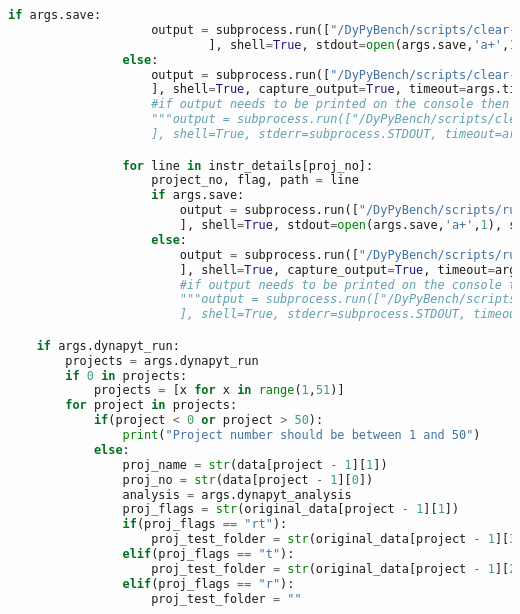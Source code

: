 \begin{lstlisting}[caption=Access Interface of DyPyBench.,label=code:dypybench.py,language=Python]
                if args.save:
                    output = subprocess.run(["/DyPyBench/scripts/clear-project.sh %s %s" %(proj_name, proj_no)
                            ], shell=True, stdout=open(args.save,'a+',1), stderr=subprocess.STDOUT, timeout=args.timeout)
                else:
                    output = subprocess.run(["/DyPyBench/scripts/clear-project.sh %s %s" %(proj_name, proj_no)
                    ], shell=True, capture_output=True, timeout=args.timeout)
                    #if output needs to be printed on the console then comment above and uncomment below
                    """output = subprocess.run(["/DyPyBench/scripts/clear-project.sh %s %s" %(proj_name, proj_no)
                    ], shell=True, stderr=subprocess.STDOUT, timeout=args.timeout)"""

                for line in instr_details[proj_no]:
                    project_no, flag, path = line
                    if args.save:
                        output = subprocess.run(["/DyPyBench/scripts/run-dynapyt-instrumentation.sh %s %s %s %s %s %s" %(proj_name, proj_no, path, analysis, flag, args.timeout)
                        ], shell=True, stdout=open(args.save,'a+',1), stderr=subprocess.STDOUT, timeout=args.timeout)
                    else:
                        output = subprocess.run(["/DyPyBench/scripts/run-dynapyt-instrumentation.sh %s %s %s %s %s %s" %(proj_name, proj_no, path, analysis, flag, args.timeout)
                        ], shell=True, capture_output=True, timeout=args.timeout)
                        #if output needs to be printed on the console then comment above and uncomment below
                        """output = subprocess.run(["/DyPyBench/scripts/run-dynapyt-instrumentation.sh %s %s %s %s %s %s" %(proj_name, proj_no, path, analysis, flag, args.timeout)
                        ], shell=True, stderr=subprocess.STDOUT, timeout=args.timeout)"""

    if args.dynapyt_run:
        projects = args.dynapyt_run
        if 0 in projects:
            projects = [x for x in range(1,51)]
        for project in projects:
            if(project < 0 or project > 50):
                print("Project number should be between 1 and 50")
            else:
                proj_name = str(data[project - 1][1])
                proj_no = str(data[project - 1][0])
                analysis = args.dynapyt_analysis
                proj_flags = str(original_data[project - 1][1])
                if(proj_flags == "rt"):
                    proj_test_folder = str(original_data[project - 1][3])
                elif(proj_flags == "t"):
                    proj_test_folder = str(original_data[project - 1][2])
                elif(proj_flags == "r"):
                    proj_test_folder = ""


\end{lstlisting}
